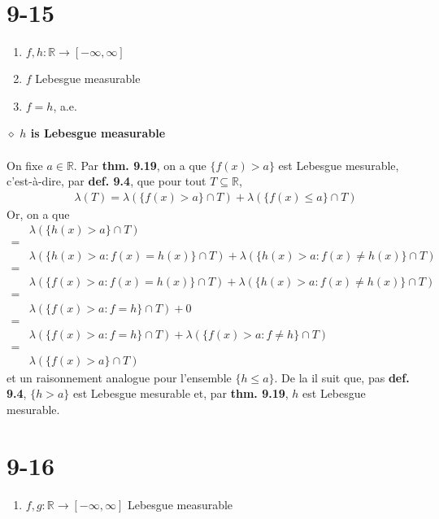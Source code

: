 \documentclass[a4paper,10pt]{article}
\begin{document}
\section*{9-15}
\begin{enumerate}
	\item $f,h : \mathbb{R} \rightarrow [-\infty, \infty]$
	\item $f$ Lebesgue measurable
	\item $f = h$, a.e.
\end{enumerate}
$\diamond$ \textbf{$h$ is Lebesgue measurable}
\\
\\
On fixe $a \in \mathbb{R}$. Par \textbf{thm. 9.19}, on a que $\{f(x) > a\}$ est Lebesgue mesurable, c'est-à-dire, par \textbf{def. 9.4}, que pour tout $T \subseteq \mathbb{R}$, 
\begin{align*}
	& \lambda (T) = \lambda(\{f(x) > a\} \cap T) + \lambda (\{f(x) \leq a\} \cap T) 
\end{align*}
Or, on a que 
\begin{align*}
	& \lambda (\{h(x) > a\} \cap T) \\ 
	= \\
	& \lambda ( \{h(x) > a : f(x) = h(x) \} \cap T) + \lambda (\{h(x) > a : f(x) \not = h(x) \} \cap T) \\
	 = \\
	 & \lambda ( \{f(x) > a : f(x) = h(x) \} \cap T) + \lambda (\{h(x) > a : f(x) \not = h(x) \} \cap T) \\
	 = \\
	 & \lambda ( \{ f(x) > a : f = h\} \cap T) + 0 \\
	 = \\
	 & \lambda ( \{ f(x) > a : f = h \} \cap T ) + \lambda ( \{ f(x) > a : f \not = h \} \cap T ) \\
	 = \\
	 & \lambda (\{ f(x) > a\} \cap T)
\end{align*}
et un raisonnement analogue pour l'ensemble $\{ h \leq a \}$. De la il suit que, pas \textbf{def. 9.4}, $\{h > a\}$ est Lebesgue mesurable et, par \textbf{thm. 9.19}, $h$ est Lebesgue mesurable.

\section*{9-16}
\begin{enumerate}
	\item $f,g : \mathbb{R} \rightarrow [-\infty, \infty]$ Lebesgue measurable
\end{enumerate}
\end{document}
